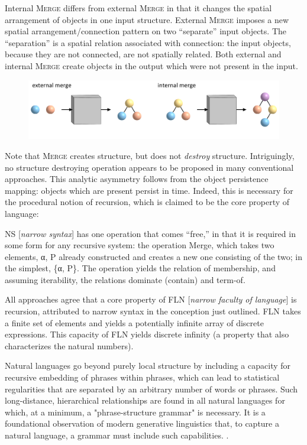   Internal \textsc{Merge} differs from external \textsc{Merge} in that it changes the spatial arrangement of objects in one input structure. External \textsc{Merge} imposes a new spatial arrangement/connection pattern on two “separate” input objects. The “separation” is a spatial relation associated with connection: the input objects, because they are not connected, are not spatially related. Both external and internal \textsc{Merge} create objects in the output which were not present in the input. 

  
\begin{figure}
\includegraphics[width=\textwidth]{figures/Tilsen-img109.png}
\caption{\missingcaption}
\label{fig:5:5}
\end{figure}
 

  Note that \textsc{Merge} creates structure, but does not \textit{destroy} structure. Intriguingly, no structure destroying operation appears to be proposed in many conventional approaches. This analytic asymmetry follows from the object persistence mapping: objects which are present persist in time. Indeed, this is necessary for the procedural notion of recursion, which is claimed to be the core property of language:

NS [\textit{narrow syntax}] has one operation that comes “free,” in that it is required in some form for any recursive system: the operation Merge, which takes two elements, α, P already constructed and creates a new one consisting of the two; in the simplest, \{α, P\}. The operation yields the relation of membership, and assuming iterability, the relations dominate (contain) and term-of. \citep{Chomsky2001b}

All approaches agree that a core property of FLN [\textit{narrow faculty of language}] is recursion, attributed to narrow syntax in the conception just outlined. FLN takes a finite set of elements and yields a potentially infinite array of discrete expressions. This capacity of FLN yields discrete infinity (a property that also characterizes the natural numbers). \citep{HauserEtAl2002}

Natural languages go beyond purely local structure by including a capacity for recursive embedding of phrases within phrases, which can lead to statistical regularities that are separated by an arbitrary number of words or phrases. Such long-distance, hierarchical relationships are found in all natural languages for which, at a minimum, a "phrase-structure grammar" is necessary. It is a foundational observation of modern generative linguistics that, to capture a natural language, a grammar must include such capabilities. \citep{HauserEtAl2002}. 

